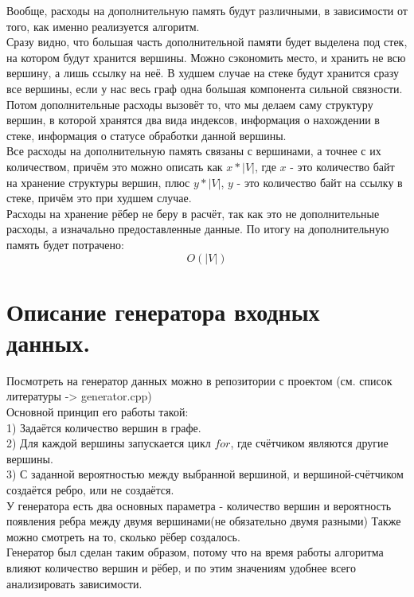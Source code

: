 \documentclass[oneside,final,14pt]{extreport}
\begin{document}
\bigskip
\noindent
Вообще, расходы на дополнительную память будут различными, в зависимости от
того, как именно реализуется алгоритм.\\
Сразу видно, что большая часть дополнительной памяти будет выделена под
стек, на котором будут хранится вершины. Можно сэкономить место, и хранить
не всю вершину, а лишь ссылку на неё. В худшем случае на стеке будут 
хранится сразу все вершины, если у нас весь граф одна большая компонента
сильной связности.\\
Потом дополнительные расходы вызовёт то, что мы делаем саму структуру
вершин, в которой хранятся два вида индексов, информация о нахождении в
стеке, информация о статусе обработки данной вершины. \\
Все расходы на дополнительную память связаны с вершинами, а точнее с их
количеством, причём это можно описать как $x * |V|$, где $x$ - это
количество байт на хранение структуры вершин, плюс $y * |V|$, $y$ - это
количество байт на ссылку в стеке, причём это при худшем случае. \\
Расходы на хранение рёбер не беру в расчёт, так как это не дополнительные
расходы, а изначально предоставленные данные.
По итогу на дополнительную память будет потрачено: $$O(|V|)$$

\newpage
\section{Описание генератора входных данных.}

\noindent
Посмотреть на генератор данных можно в репозитории с проектом
(см. список литературы -> generator.cpp) \\
Основной принцип его работы такой: \\
1) Задаётся количество вершин в графе. \\
2) Для каждой вершины запускается цикл $for$, где счётчиком являются другие
вершины. \\
3) С заданной вероятностью между выбранной вершиной, и вершиной-счётчиком
создаётся ребро, или не создаётся.\\
У генератора есть два основных параметра - количество вершин и вероятность
появления ребра между двумя вершинами(не обязательно двумя разными)
Также можно смотреть на то, сколько рёбер создалось.\\
Генератор был сделан таким образом, потому что на время работы алгоритма
влияют количество вершин и рёбер, и по этим значениям удобнее всего
анализировать зависимости.
\end{document}
